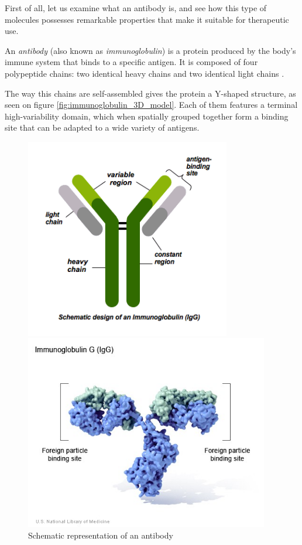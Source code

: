 First of all, let us examine what an antibody is, and see how this
type of molecules possesses remarkable properties that make it suitable
for therapeutic use.

An \emph{antibody} (also known as \emph{immunoglobulin}) is a protein produced by the 
body's immune system that binds to a specific antigen. It is composed of four
polypeptide chains: two identical heavy chains 
and two identical light chains \cite{davies_antibody_1993}. 

The way this chains are self-assembled gives the protein a Y-shaped structure,
as seen on figure \ref{fig:immunoglobulin_3D_model}. 
Each of them features a terminal high-variability domain, which when spatially grouped 
together form a binding site that can be adapted to a wide variety of antigens.

\begin{figure}[H]
    \begin{minipage}{0.495\textwidth}
        \centering
        \includegraphics[width=0.8\textwidth]{../Images/schematics_antibody.png}
        \caption{Schematic representation of an antibody} 
        \label{fig:schematics_antibody}
    \end{minipage}\hfill
    \begin{minipage}{0.495\textwidth}
        \centering
        \includegraphics[width=0.95\textwidth]{../Images/immunoglobulin_3D_model.jpg}   

\end{minipage}
\end{figure}
